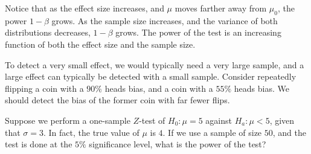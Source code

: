 \begin{remark}
Notice that as the effect size increases, and $\mu$ moves farther away from $\mu_0$, the power $1-\beta$ grows. As the sample size increases, and the variance of both distributions decreases, $1-\beta$ grows. The power of the test is an increasing function of both the effect size and the sample size.
\end{remark}

To detect a very small effect, we would typically need a very large sample, and a large effect can typically be detected with a small sample. Consider repeatedly flipping a coin with a $90\%$ heads bias, and a coin with a $55\%$ heads bias. We should detect the bias of the former coin with far fewer flips.

\begin{example}
Suppose we perform a one-sample $Z$-test of $H_0: \mu = 5$ against $H_a: \mu < 5$, given that $\sigma = 3$. In fact, the true value of $\mu$ is $4$. If we use a sample of size $50$, and the test is done at the $5\%$ significance level, what is the power of the test?

\begin{center}
\end{center}


\end{example}
